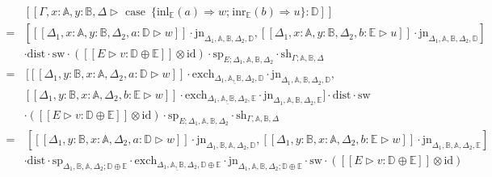 \begin{equation*}
  \begin{split}
    & [\![\Gamma,x:\mathbb{A}, y:\mathbb{B}, \Delta \triangleright \text{ case }  \hspace{2pt}  \{\text{inl}_{\mathbb{E}} (a) \Rightarrow w ; \hspace{1pt} \text{inr}_{\mathbb{E}} (b) \Rightarrow u\}: \mathbb{D}]\!] \\
     =  &\left[[\![  \Delta_{1},x:\mathbb{A},y:\mathbb{B},  \Delta_{2}, a:\mathbb{D} \triangleright w ]\!] \cdot  \text{jn}_{\Delta_{1},\mathbb{A},\mathbb{B},  \Delta_{2},\mathbb{D}},[\![  \Delta_{1},x:\mathbb{A},y:\mathbb{B},  \Delta_{2}, b:\mathbb{E} \triangleright u ]\!] \cdot  \text{jn}_{\Delta_{1},\mathbb{A},\mathbb{B},  \Delta_{2},\mathbb{D}}\right]  \\
     &\cdot \text{dist} \cdot \text{sw} \cdot ([\![E \triangleright v : \mathbb{D} \oplus \mathbb{E}  ]\!] \otimes \text{id}) \cdot \text{sp}_{E; \Delta_{1},\mathbb{A},\mathbb{B},  \Delta_{2}} \cdot \text{sh}_{\Gamma;\mathbb{A}, \mathbb{B},\Delta} \\
    = & \hspace{2pt}  [[\![\Delta_{1},y:\mathbb{B}, x:\mathbb{A},  \Delta_{2}, a:\mathbb{D} \triangleright w ]\!]  \cdot \text{exch}_{\Delta_{1},\underline{\mathbb{A},\mathbb{B}},  \Delta_{2},\mathbb{D}} \cdot \text{jn}_{\Delta_{1},\mathbb{A},\mathbb{B},  \Delta_{2},\mathbb{D}}, \\
    &   [\![\Delta_{1},y:\mathbb{B}, x:\mathbb{A},  \Delta_{2}, b:\mathbb{E} \triangleright w ]\!] \cdot \text{exch}_{\Delta_{1},\underline{\mathbb{A},\mathbb{B}},  \Delta_{2},\mathbb{E}} \cdot \text{jn}_{\Delta_{1},\mathbb{A},\mathbb{B},  \Delta_{2},\mathbb{E}} ] \cdot \text{dist} \cdot \text{sw}  \\
    &\cdot ([\![E \triangleright v : \mathbb{D} \oplus \mathbb{E}  ]\!] \otimes \text{id}) \cdot\text{sp}_{E; \Delta_{1},\mathbb{A},\mathbb{B},  \Delta_{2}} \cdot \text{sh}_{\Gamma,\mathbb{A}, \mathbb{B},\Delta} \\
    =  &\hspace{2pt}  [[\![\Delta_{1},y:\mathbb{B}, x:\mathbb{A},  \Delta_{2}, a:\mathbb{D} \triangleright w ]\!]  \cdot \text{jn}_{\Delta_{1},\mathbb{B}, \mathbb{A}, \Delta_{2},\mathbb{D}}, [\![\Delta_{1},y:\mathbb{B}, x:\mathbb{A},  \Delta_{2}, b:\mathbb{E} \triangleright w ]\!] \cdot \text{jn}_{\Delta_{1},\mathbb{B}, \mathbb{A}, \Delta_{2},\mathbb{E}}]   \\ 
    &\cdot \text{dist}  \cdot \text{sp}_{\Delta_{1},\mathbb{B},\mathbb{A},  \Delta_{2}; \mathbb{D} \oplus \mathbb{E} } \cdot \text{exch}_{ \Delta_{1},\underline{\mathbb{A},\mathbb{B}},  \Delta_{2}, \mathbb{D} \oplus \mathbb{E} } \cdot \text{jn}_{\Delta_{1},\mathbb{A},\mathbb{B},  \Delta_{2}; \mathbb{D} \oplus \mathbb{E} } \cdot \text{sw}\cdot ([\![E \triangleright v : \mathbb{D} \oplus \mathbb{E}  ]\!] \otimes \text{id})\\

\end{split}
\end{equation*}
